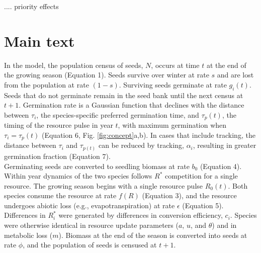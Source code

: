 \documentclass[11pt,letterpaper]{article}
\begin{document}
.... priority effects 




\newpage
\section{Main text} %




In the model, the population census of seeds, $N$, occurs at time $t$ at the end of the growing season (Equation 1).  Seeds survive over winter at rate $s$ and are lost from the population at rate $(1-s)$.  Surviving seeds germinate at rate $g_{i}(t)$.  Seeds that do not germinate remain in the seed bank until the next census at $t+1$.  Germination rate is a Gaussian function that declines with the distance between $\tau_{i}$, the species-specific preferred germination time, and $\tau_{p}(t)$, the timing of the resource pulse in year $t$, with maximum germination when $\tau_{i} = \tau_{p}(t)$ (Equation 6, Fig. \ref{fig:concept}a,b).  In cases that include tracking, the distance between $\tau_{i}$ and  $\tau_{p(t)}$ can be reduced by tracking, $\alpha_{i}$, resulting in greater germination fraction (Equation 7). \\

Germinating seeds are converted to seedling biomass at rate $b_{0}$ (Equation 4). Within year dynamics of the two species follows $R^{*}$ competition for a single resource.  The growing season begins with a single resource pulse $R_0(t)$.  Both  species consume the resource at rate $f(R)$ (Equation 3), and the resource undergoes abiotic loss (e.g., evapotranspiration) at rate $\epsilon$ (Equation 5).  Differences in $R^{*}_{i}$ were generated by differences in conversion efficiency, $c_{i}$. Species were otherwise identical in resource update parameters ($a$, $u$, and $\theta$) and in metabolic loss ($m$).  Biomass at the end of the season is converted into seeds at rate $\phi$, and the population of seeds is censused at $t+1$. \\
\end{document}
